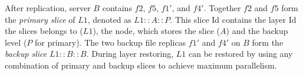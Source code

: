After replication, server $B$ contains $f2$, $f5$, $f1'$, and $f4'$. Together
$f2$ and $f5$ form the \emph{primary slice} of $L1$, denoted as $L1::A::P$.
This slice Id contains the layer Id the slices belongs to ($L1$), the node, which
stores the slice ($A$) and the backup level ($P$ for primary).
%
The two backup file replicas 
$f1'$ and $f4'$ on $B$ form the \emph{backup slice} $L1::B::B$.
During layer restoring, $L1$ can be restored by using any combination of primary and backup slices
to achieve maximum parallelism.
%

